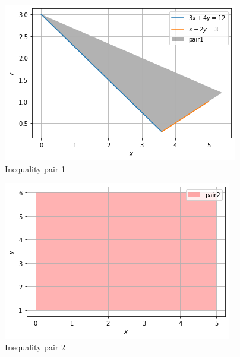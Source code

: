 


\begin{figure}[!ht]
    \centering
    \includegraphics[width=\columnwidth]{solutions/su2021/2/56/Figure9_1.png}
    \caption{Inequality pair 1}
    \label{ineq/56/fig:inequalities1}	
    \end{figure}
    
    \begin{figure}[!ht]
    \centering
    \includegraphics[width=\columnwidth]{solutions/su2021/2/56/Figure9_2.png}
    \caption{Inequality pair 2}
    \label{ineq/56/fig:inequalities2}	
    \end{figure}
    
